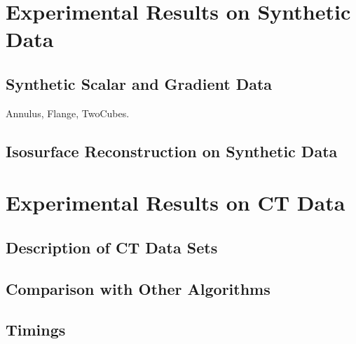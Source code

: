
\section{Experimental Results on Synthetic Data}

\subsection{Synthetic Scalar and Gradient Data}

Annulus, Flange, TwoCubes.

\subsection{Isosurface Reconstruction on Synthetic Data}

\section{Experimental Results on CT Data}

\subsection{Description of CT Data Sets}

\subsection{Comparison with Other Algorithms}

\subsection{Timings}

